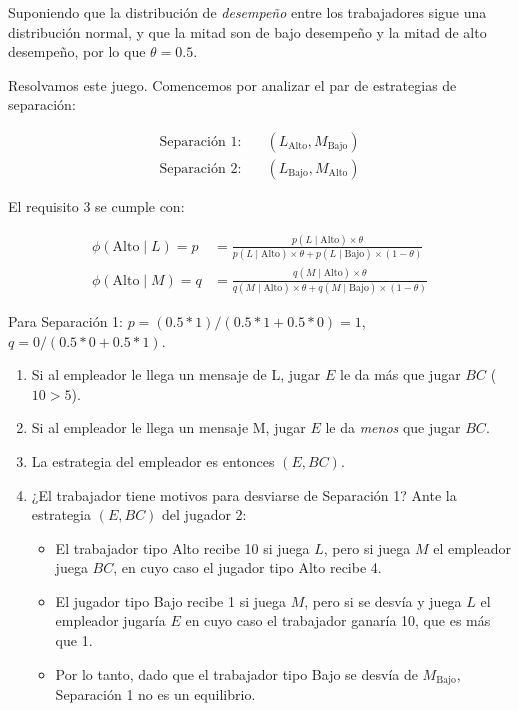 \documentclass[12pt]{article}
\begin{document}
Suponiendo que la distribución de \textit{desempeño} entre los trabajadores sigue una distribución normal, y que la mitad son de bajo desempeño y la mitad de alto desempeño, por lo que $ \theta = 0.5 $. 

Resolvamos este juego. Comencemos por analizar el par de estrategias de separación:

\begin{align*}
	\text{Separación 1:}\quad &(L_{\text{Alto}}, M_{\text{Bajo}})\\
	\text{Separación 2:}\quad &(L_{\text{Bajo}}, M_{\text{Alto}})
\end{align*} 

El requisito 3 se cumple con:

\begin{align*}
	\phi(\text{Alto}\mid L) = p &= \frac{p(L\mid \text{Alto})\times\theta}{p(L\mid \text{Alto})\times\theta+p(L\mid \text{Bajo})\times(1-\theta)}\\
%
	\phi(\text{Alto}\mid M) = q &= \frac{q(M\mid \text{Alto})\times\theta}{q(M\mid \text{Alto})\times\theta+q(M\mid \text{Bajo})\times(1-\theta)}
\end{align*}

Para Separación 1: $ p=(0.5*1)/(0.5*1 + 0.5*0)=1 $, $ q=0/(0.5*0 + 0.5*1) $. 

\begin{enumerate}
\setlength{\itemsep}{0pt}
\setlength{\parskip}{0pt}
\setlength{\parsep}{0pt}
	\item Si al empleador le llega un mensaje de L, jugar $ E $ le da más que jugar $ BC $ ($ 10 > 5 $).
	\item Si al empleador le llega un mensaje M, jugar $ E $ le da \textit{menos} que jugar $ BC $.
	\item La estrategia del empleador es entonces $( E, BC )$.
	\item ¿El trabajador tiene motivos para desviarse de Separación 1? Ante la estrategia $ (E, BC) $ del jugador 2:
	\begin{itemize}
	\setlength{\itemsep}{0pt}
	\setlength{\parskip}{0pt}
	\setlength{\parsep}{0pt}
		\item El trabajador tipo Alto recibe 10 si juega $ L $, pero si juega $ M $ el empleador juega $ BC $, en cuyo caso el jugador tipo Alto recibe 4. 
		\item El jugador tipo Bajo recibe 1 si juega $ M $, pero si se desvía y juega $ L $ el empleador jugaría $ E $ en cuyo caso el trabajador ganaría 10, que es más que 1. 
		\item Por lo tanto, dado que el trabajador tipo Bajo se desvía de $ M_\text{Bajo} $, Separación 1 no es un equilibrio.
	\end{itemize} 
\end{enumerate}
\end{document}

